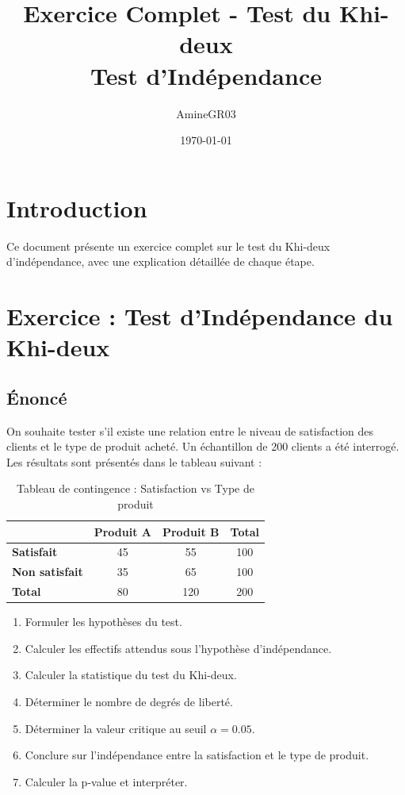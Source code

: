 \documentclass[11pt,a4paper]{article}
\title{Exercice Complet - Test du Khi-deux\\
\large Test d'Indépendance}
\author{AmineGR03}
\date{\today}
\begin{document}
\maketitle

\tableofcontents
\newpage

\section{Introduction}

Ce document présente un exercice complet sur le test du Khi-deux d'indépendance, avec une explication détaillée de chaque étape.

\newpage

\section{Exercice : Test d'Indépendance du Khi-deux}

\subsection{Énoncé}

On souhaite tester s'il existe une relation entre le niveau de satisfaction des clients et le type de produit acheté. Un échantillon de 200 clients a été interrogé. Les résultats sont présentés dans le tableau suivant :

\begin{table}[h]
\centering
\begin{tabular}{|l|c|c|c|}
\hline
 & \textbf{Produit A} & \textbf{Produit B} & \textbf{Total} \\
\hline
\textbf{Satisfait} & 45 & 55 & 100 \\
\hline
\textbf{Non satisfait} & 35 & 65 & 100 \\
\hline
\textbf{Total} & 80 & 120 & 200 \\
\hline
\end{tabular}
\caption{Tableau de contingence : Satisfaction vs Type de produit}
\end{table}

\begin{enumerate}
    \item Formuler les hypothèses du test.
    \item Calculer les effectifs attendus sous l'hypothèse d'indépendance.
    \item Calculer la statistique du test du Khi-deux.
    \item Déterminer le nombre de degrés de liberté.
    \item Déterminer la valeur critique au seuil $\alpha = 0.05$.
    \item Conclure sur l'indépendance entre la satisfaction et le type de produit.
    \item Calculer la p-value et interpréter.
\end{enumerate}
\end{document}

